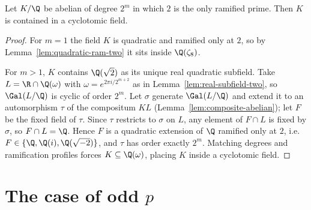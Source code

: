 \begin{theorem}[Kronecker--Weber for $p = 2$]
  \label{thm:case-p-2}
  Let $K/\Q$ be abelian of degree $2^m$ in which $2$ is the only ramified
  prime. Then $K$ is contained in a cyclotomic field.
\end{theorem}
\begin{proof}
  For $m = 1$ the field $K$ is quadratic and ramified only at $2$, so by
  Lemma~\ref{lem:quadratic-ram-two} it sits inside $\Q(\zeta_8)$.

  For $m > 1$, $K$ contains $\Q(\sqrt 2)$ as its unique real quadratic
  subfield. Take $L = \R \cap \Q(\omega)$ with $\omega = e^{2\pi i/2^{m+2}}$ as
  in Lemma~\ref{lem:real-subfield-two}, so $\Gal(L/\Q)$ is cyclic of order
  $2^m$. Let $\sigma$ generate $\Gal(L/\Q)$ and extend it to an automorphism
  $\tau$ of the compositum $KL$ (Lemma~\ref{lem:composite-abelian}); let $F$ be
  the fixed field of $\tau$. Since $\tau$ restricts to $\sigma$ on $L$, any
  element of $F \cap L$ is fixed by $\sigma$, so $F \cap L = \Q$. Hence $F$ is a
  quadratic extension of $\Q$ ramified only at $2$, i.e. $F \in \{\Q, \Q(i),
  \Q(\sqrt{-2})\}$, and $\tau$ has order exactly $2^m$. Matching degrees and
  ramification profiles forces $K \subseteq \Q(\omega)$, placing $K$ inside a
  cyclotomic field.
\end{proof}

\section{The case of odd \texorpdfstring{$p$}{p}}

